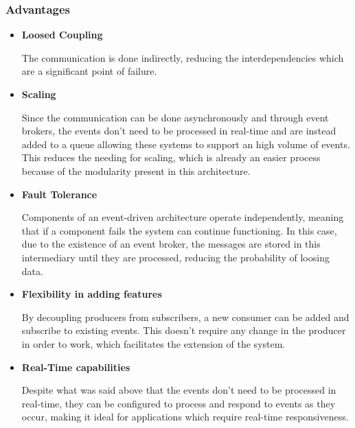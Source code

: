 \subsubsection{Advantages}
\begin{itemize}
	\item \textbf{Loosed Coupling}

	      The communication is done indirectly, reducing the interdependencies which
	      are a significant point of failure.

	\item \textbf{Scaling}

	      Since the communication can be done asynchronously and through event brokers,
	      the events don't need to be processed in real-time and are instead added to
	      a queue allowing these systems to support an high volume of events. This
	      reduces the needing for scaling, which is already an easier process because
	      of the modularity present in this architecture.

	\item \textbf{Fault Tolerance}

	      Components of an event-driven architecture operate independently, meaning
	      that if a component fails the system can continue functioning. In this
	      case, due to the existence of an event broker, the messages are stored in
	      this intermediary until they are processed, reducing the probability of
	      loosing data.

	\item \textbf{Flexibility in adding features}

	      By decoupling producers from subscribers, a new consumer can be added
	      and subscribe to existing events. This doesn't require any change in the
	      producer in order to work, which facilitates the extension of the
	      system.

	\item \textbf{Real-Time capabilities}

	      Despite what was said above that the events don't need to be processed
	      in real-time, they can be configured to process and respond to events
	      as they occur, making it ideal for applications which require real-time
	      responsiveness.
\end{itemize}

